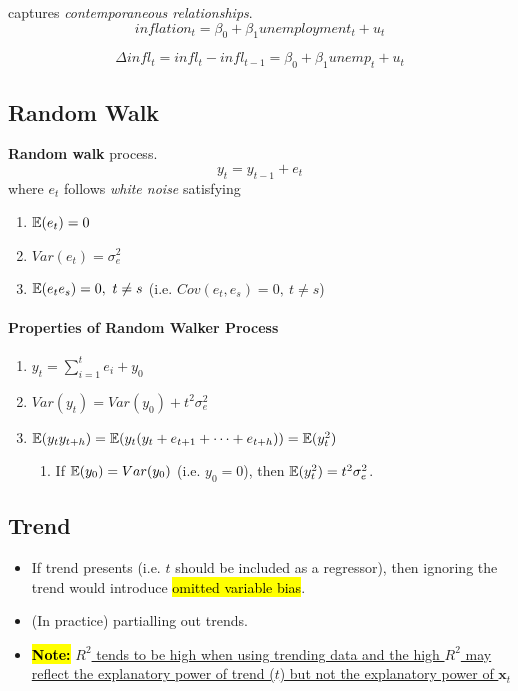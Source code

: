 \documentclass[]{article}
\begin{document}
		\begin{example}
			captures \emph{contemporaneous relationships}.
			\[
				inflation_t = \beta_0 + \beta_1 unemployment_t + u_t
			\]
		\end{example}
		
		\begin{example}
			\[
				\Delta infl_t = infl_t - infl_{t-1} = \beta_0 + \beta_1 unemp_t + u_t
			\]
		\end{example}
		
		\subsection{Random Walk}
		
		\begin{definition}
			\textbf{Random walk} process.
			\[
				y_t = y_{t-1}+ e_t
			\]
			where $e_t$ follows \emph{white noise} satisfying
			\begin{enumerate}
				\item $\mathbb{E}({e_t}) = 0$
				\item $Var(e_t) = \sigma_e^2$
				\item $\mathbb{E}({e_t e_s}) = 0,\ t \neq s$ (i.e. $Cov(e_t, e_s) = 0,\ t \neq s$)
			\end{enumerate}
		\end{definition}
		\paragraph{Properties of Random Walker Process}
			\begin{enumerate}
				\item $y_t = \sum_{i=1}^t e_i + y_0$
				\item $Var(y_t) = Var(y_0) + t^2 \sigma_e^2$
				\item $\mathbb{E}({y_t y_{t+h}}) = \mathbb{E}({y_t (y_t + e_{t+1} + \dots + e_{t+h})}) = \mathbb{E}({y_t^2})$
				\begin{enumerate}
					\item If $\mathbb{E}({y_0}) = Var(y_0)$ (i.e. $y_0=0$), then $\mathbb{E}({y_t^2}) = t^2 \sigma_e^2$.
				\end{enumerate}
			\end{enumerate}
		
		\subsection{Trend}
			\begin{itemize}
				\item If trend presents (i.e. $t$ should be included as a regressor), then ignoring the trend would introduce \hl{omitted variable bias}.
				\item (In practice) partialling out trends.
				\item \hl{\textbf{Note:}} \ul{$R^2$ tends to be high when using trending data and the high $R^2$ may reflect the explanatory power of trend ($t$) but not the explanatory power of $\textbf{x}_t$}
			\end{itemize}
		
\end{document}
